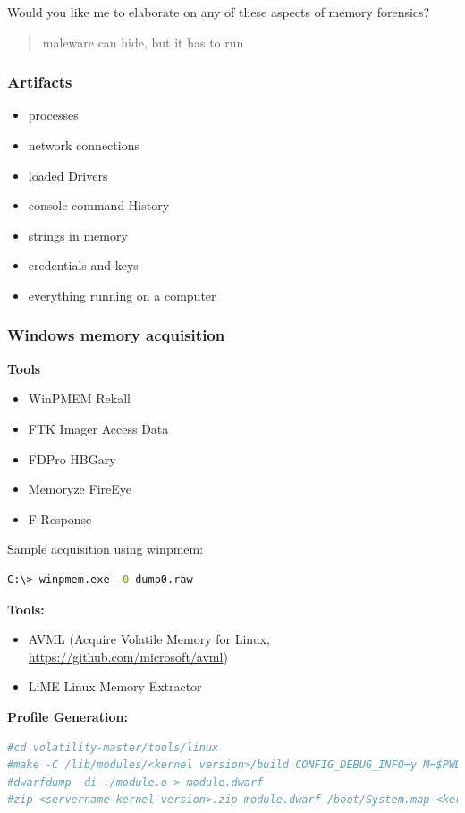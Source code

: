 Would you like me to elaborate on any of these aspects of memory forensics?

\begin{quotation}
  maleware can hide, but it has to run
\end{quotation}

\subsubsection*{Artifacts}
\begin{itemize}
  \item processes
  \item network connections
  \item loaded Drivers
  \item console command History
  \item strings in memory
  \item credentials and keys
  \item everything running on a computer
\end{itemize}

\subsubsection*{Windows memory acquisition}
\textbf{Tools}
\begin{itemize}
  \item WinPMEM Rekall
  \item FTK Imager Access Data
  \item FDPro HBGary
  \item Memoryze FireEye
  \item F-Response
\end{itemize}

Sample acquisition using winpmem:

\begin{lstlisting}[language=sh]
C:\> winpmem.exe -0 dump0.raw
\end{lstlisting}

\textbf{Tools:}
\begin{itemize}
   \item AVML (Acquire Volatile Memory for Linux, \url{https://github.com/microsoft/avml})
   \item LiME Linux Memory Extractor
\end{itemize}

\textbf{Profile Generation:}
\begin{lstlisting}[language=sh]
#cd volatility-master/tools/linux
#make -C /lib/modules/<kernel version>/build CONFIG_DEBUG_INFO=y M=$PWD modules
#dwarfdump -di ./module.o > module.dwarf
#zip <servername-kernel-version>.zip module.dwarf /boot/System.map-<kernel-version>
\end{lstlisting}

